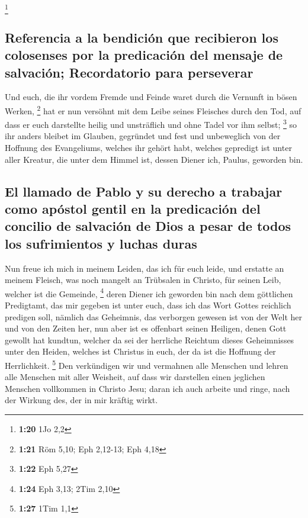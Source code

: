 \footnote{\textbf{1:20} 1Jo 2,2}

\hypertarget{referencia-a-la-bendiciuxf3n-que-recibieron-los-colosenses-por-la-predicaciuxf3n-del-mensaje-de-salvaciuxf3n-recordatorio-para-perseverar}{%
\subsection{Referencia a la bendición que recibieron los colosenses por
la predicación del mensaje de salvación; Recordatorio para
perseverar}\label{referencia-a-la-bendiciuxf3n-que-recibieron-los-colosenses-por-la-predicaciuxf3n-del-mensaje-de-salvaciuxf3n-recordatorio-para-perseverar}}

 Und euch, die ihr vordem Fremde und Feinde waret durch
die Vernunft in bösen Werken, \footnote{\textbf{1:21} Röm 5,10; Eph
  2,12-13; Eph 4,18}  hat er nun versöhnt mit dem Leibe
seines Fleisches durch den Tod, auf dass er euch darstellte heilig und
unsträflich und ohne Tadel vor ihm selbst; \footnote{\textbf{1:22} Eph
  5,27}  so ihr anders bleibet im Glauben, gegründet und
fest und unbeweglich von der Hoffnung des Evangeliums, welches ihr
gehört habt, welches gepredigt ist unter aller Kreatur, die unter dem
Himmel ist, dessen Diener ich, Paulus, geworden bin.

\hypertarget{el-llamado-de-pablo-y-su-derecho-a-trabajar-como-apuxf3stol-gentil-en-la-predicaciuxf3n-del-concilio-de-salvaciuxf3n-de-dios-a-pesar-de-todos-los-sufrimientos-y-luchas-duras}{%
\subsection{El llamado de Pablo y su derecho a trabajar como apóstol
gentil en la predicación del concilio de salvación de Dios a pesar de
todos los sufrimientos y luchas
duras}\label{el-llamado-de-pablo-y-su-derecho-a-trabajar-como-apuxf3stol-gentil-en-la-predicaciuxf3n-del-concilio-de-salvaciuxf3n-de-dios-a-pesar-de-todos-los-sufrimientos-y-luchas-duras}}

 Nun freue ich mich in meinem Leiden, das ich für euch
leide, und erstatte an meinem Fleisch, was noch mangelt an Trübsalen in
Christo, für seinen Leib, welcher ist die Gemeinde, \footnote{\textbf{1:24}
  Eph 3,13; 2Tim 2,10}  deren Diener ich geworden bin
nach dem göttlichen Predigtamt, das mir gegeben ist unter euch, dass ich
das Wort Gottes reichlich predigen soll,  nämlich das
Geheimnis, das verborgen gewesen ist von der Welt her und von den Zeiten
her, nun aber ist es offenbart seinen Heiligen,  denen
Gott gewollt hat kundtun, welcher da sei der herrliche Reichtum dieses
Geheimnisses unter den Heiden, welches ist Christus in euch, der da ist
die Hoffnung der Herrlichkeit. \footnote{\textbf{1:27} 1Tim 1,1}
 Den verkündigen wir und vermahnen alle Menschen und
lehren alle Menschen mit aller Weisheit, auf dass wir darstellen einen
jeglichen Menschen vollkommen in Christo Jesu;  daran ich
auch arbeite und ringe, nach der Wirkung des, der in mir kräftig wirkt.

